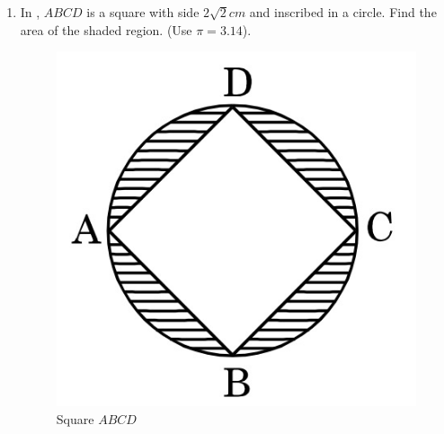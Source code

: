\begin{enumerate}
\item In  , $ABCD$ is a square with side $2\sqrt{2}cm$ and inscribed in a circle. Find the area of the shaded region. (Use $\pi = 3.14$).
\begin{figure}[H]
    \centering
    \includegraphics[width=\columnwidth]{figs/img5.jpg}
    \caption{Square $ABCD$ }
    \label{fig:Fig_5}
\end{figure}
\end{enumerate}
